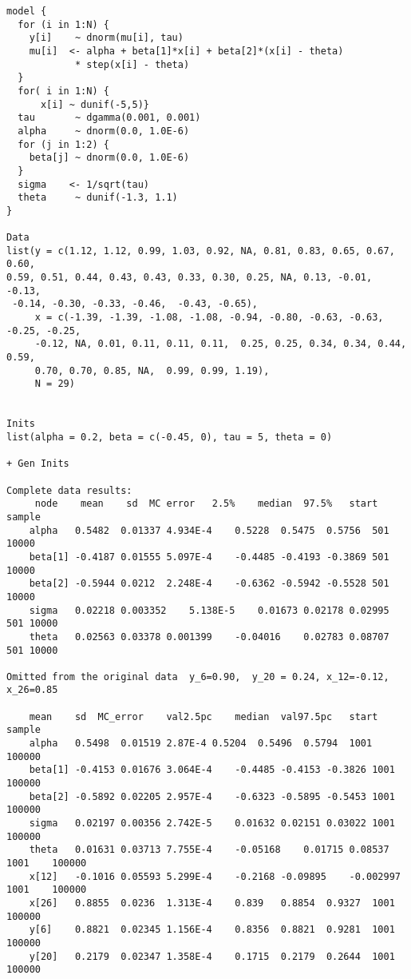 \documentclass[12pt]{article}
\begin{document}
\begin{verbatim}
model {
  for (i in 1:N) {
    y[i]    ~ dnorm(mu[i], tau)
    mu[i]  <- alpha + beta[1]*x[i] + beta[2]*(x[i] - theta)
            * step(x[i] - theta)
  }
  for( i in 1:N) {
      x[i] ~ dunif(-5,5)}
  tau       ~ dgamma(0.001, 0.001)
  alpha     ~ dnorm(0.0, 1.0E-6)
  for (j in 1:2) {
    beta[j] ~ dnorm(0.0, 1.0E-6)
  }
  sigma    <- 1/sqrt(tau)
  theta     ~ dunif(-1.3, 1.1)
}
	
Data
list(y = c(1.12, 1.12, 0.99, 1.03, 0.92, NA, 0.81, 0.83, 0.65, 0.67, 0.60,  
0.59, 0.51, 0.44, 0.43, 0.43, 0.33, 0.30, 0.25, NA, 0.13, -0.01, -0.13, 
 -0.14, -0.30, -0.33, -0.46,  -0.43, -0.65),
     x = c(-1.39, -1.39, -1.08, -1.08, -0.94, -0.80, -0.63, -0.63, -0.25, -0.25, 
     -0.12, NA, 0.01, 0.11, 0.11, 0.11,  0.25, 0.25, 0.34, 0.34, 0.44, 0.59, 
     0.70, 0.70, 0.85, NA,  0.99, 0.99, 1.19),
     N = 29)


Inits
list(alpha = 0.2, beta = c(-0.45, 0), tau = 5, theta = 0)

+ Gen Inits

Complete data results:
	 node	 mean	 sd	 MC error	2.5%	median	97.5%	start	sample
	alpha	0.5482	0.01337	4.934E-4	0.5228	0.5475	0.5756	501	10000
	beta[1]	-0.4187	0.01555	5.097E-4	-0.4485	-0.4193	-0.3869	501	10000
	beta[2]	-0.5944	0.0212	2.248E-4	-0.6362	-0.5942	-0.5528	501	10000
	sigma	0.02218	0.003352	5.138E-5	0.01673	0.02178	0.02995	501	10000
	theta	0.02563	0.03378	0.001399	-0.04016	0.02783	0.08707	501	10000
	
Omitted from the original data  y_6=0.90,  y_20 = 0.24, x_12=-0.12, x_26=0.85

	mean	sd	MC_error	val2.5pc	median	val97.5pc	start	sample
	alpha	0.5498	0.01519	2.87E-4	0.5204	0.5496	0.5794	1001	100000
	beta[1]	-0.4153	0.01676	3.064E-4	-0.4485	-0.4153	-0.3826	1001	100000
	beta[2]	-0.5892	0.02205	2.957E-4	-0.6323	-0.5895	-0.5453	1001	100000
	sigma	0.02197	0.00356	2.742E-5	0.01632	0.02151	0.03022	1001	100000
	theta	0.01631	0.03713	7.755E-4	-0.05168	0.01715	0.08537	1001	100000
	x[12]	-0.1016	0.05593	5.299E-4	-0.2168	-0.09895	-0.002997	1001	100000
	x[26]	0.8855	0.0236	1.313E-4	0.839	0.8854	0.9327	1001	100000
	y[6]	0.8821	0.02345	1.156E-4	0.8356	0.8821	0.9281	1001	100000
	y[20]	0.2179	0.02347	1.358E-4	0.1715	0.2179	0.2644	1001	100000
\end{verbatim}
\end{document}
